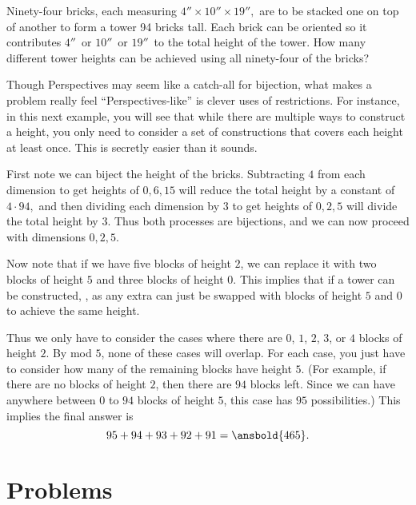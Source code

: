 \documentclass[mast]{lucky}
\begin{document}
\begin{exam}[AIME 1994/11]
Ninety-four bricks, each measuring $4''\times10''\times19'',$ are to be stacked one on top of another to form a tower 94 bricks tall. Each brick can be oriented so it contributes $4''\,$ or $10''\,$ or $19''\,$ to the total height of the tower. How many different tower heights can be achieved using all ninety-four of the bricks? 
\end{exam}

Though Perspectives may seem like a catch-all for bijection, what makes a problem really feel ``Perspectives-like'' is clever uses of restrictions. For instance, in this next example, you will see that while there are multiple ways to construct a height, you only need to consider a set of constructions that covers each height at least once. This is secretly easier than it sounds.

\begin{sol}
First note we can biject the height of the bricks. Subtracting $4$ from each dimension to get heights of $0, 6, 15$ will reduce the total height by a constant of $4\cdot 94,$ and then dividing each dimension by $3$ to get heights of $0, 2, 5$ will divide the total height by $3$. Thus both processes are bijections, and we can now proceed with dimensions $0, 2, 5$.

Now note that if we have five blocks of height $2$, we can replace it with two blocks of height $5$ and three blocks of height $0$. This implies that if a tower can be constructed, , as any extra can just be swapped with blocks of height $5$ and $0$ to achieve the same height.

Thus we only have to consider the cases where there are $0$, $1$, $2$, $3$, or $4$ blocks of height $2$. By mod $5$, none of these cases will overlap. For each case, you just have to consider how many of the remaining blocks have height $5$. (For example, if there are no blocks of height $2$, then there are $94$ blocks left. Since we can have anywhere between $0$ to $94$ blocks of height $5$, this case has $95$ possibilities.) This implies the final answer is
\[95+94+93+92+91=\ansbold{465}.\]
\end{sol}

\pagebreak

\section{Problems}
\end{document}
